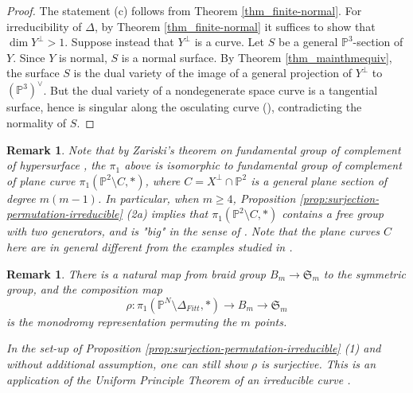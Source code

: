 \documentclass[12pt]{amsart}
\newtheorem{remark}[theorem]{Remark}
\begin{document}
\begin{proof}
 The statement (c) follows from Theorem \ref{thm_finite-normal}. 
For irreducibility of $\Delta$, by Theorem \ref{thm_finite-normal} it suffices to show
that $\dim Y^\perp>1$. Suppose instead that $Y^\perp$ is a curve.
Let $S$ be a general $\mathbb P^3$-section of $Y$. Since $Y$ is normal,
$S$ is a normal surface. By Theorem \ref{thm_mainthmequiv}, the surface $S$
is the dual variety of the image of a general projection of $Y^\perp$ to $(\mathbb P^3)^\vee$.
But the dual variety of a nondegenerate space curve is a tangential surface,
hence is singular along the osculating curve
(\cite[Proposition 10.24]{Dolgachev-classicalAG}), contradicting the normality of $S$.
\end{proof}

\begin{remark}\normalfont
Note that by Zariski's theorem on fundamental group of complement of hypersurface \cite[Theorem 3.22]{Voisin}, the $\pi_1$ above is isomorphic to fundamental group of complement of plane curve 
$\pi_1(\mathbb P^2\setminus C,*)$, where $C=X^{\perp}\cap \mathbb P^2$ is a general plane section of degree $m(m-1)$. In particular, when $m\ge 4$,  Proposition \ref{prop:surjection-permutation-irreducible} (2a) implies that $\pi_1(\mathbb P^2\setminus C,*)$ contains a free group with two generators, and is "big" in the sense of \cite{large-pi1}. Note that the plane curves $C$ here are in general different from the examples studied in \cite{large-pi1}.%
\end{remark}
\begin{remark}\normalfont
    There is a natural map from braid group $B_m \to \mathfrak S_m$ to the symmetric group, and the composition map 
$$\rho:\pi_1\left(\mathbb{P}^N\setminus\Delta_{Fitt},\ast\right)\to B_m \to \mathfrak S_m$$
is the monodromy representation permuting the $m$ points. 

In the set-up of Proposition \ref{prop:surjection-permutation-irreducible} (1) and without additional assumption, one can still show $\rho$ is surjective. This is an application of the Uniform Principle Theorem of an irreducible curve \cite[p.111]{ACGH85}.
\end{remark}
\end{document}
